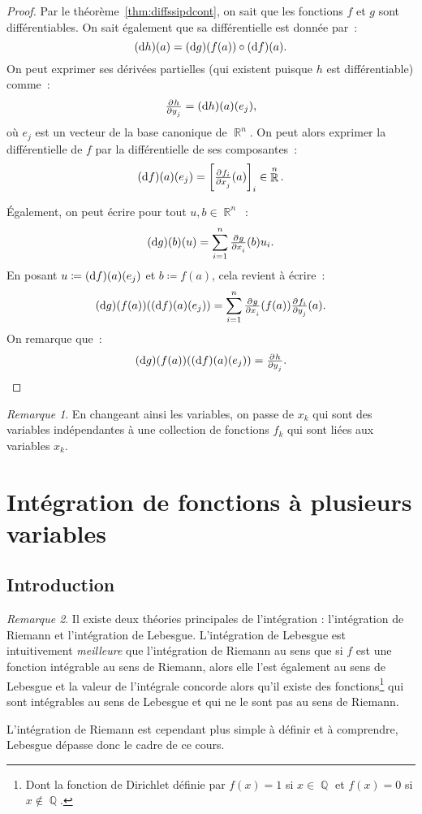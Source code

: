 \documentclass{article}
\DeclareMathOperator{\Q}{\mathbb Q}
\DeclareMathOperator{\R}{\mathbb R}
\theoremstyle{definition}
\theoremstyle{remark}
\newtheorem*{rmq}{Remarque}
\begin{document}
		\begin{proof} Par le théorème~\ref{thm:diffssipdcont}, on sait que les fonctions $f$ et $g$ sont différentiables. On sait également que sa
		différentielle est donnée par~:
		\[(\dif h)(a) = (\dif g)(f(a)) \circ (\dif f)(a).\]
		On peut exprimer ses dérivées partielles (qui existent puisque $h$ est différentiable) comme~:
		\[\pd h{y_j} = (\dif h)(a)(e_j),\]
		où $e_j$ est un vecteur de la base canonique de $\R^n$.
		On peut alors exprimer la différentielle de $f$ par la différentielle de ses composantes~:
		\[(\dif f)(a)(e_j) = \left[\pd {f_i}{x_j}(a)\right]_i \in \R^n.\]

		Également, on peut écrire pour tout $u, b \in \R^n$~:
		\[(\dif g)(b)(u) = \sum_{i=1}^n\pd g{x_i}(b)u_i.\]
		En posant $u \coloneqq (\dif f)(a)(e_j)$ et $b \coloneqq f(a)$, cela revient à écrire~:
		\[(\dif g)(f(a))((\dif f)(a)(e_j)) = \sum_{i=1}^n\pd g{x_i}(f(a))\pd {f_i}{y_j}(a).\]
		On remarque que~:
		\[(\dif g)(f(a))((\dif f)(a)(e_j)) = \pd h{y_j}.\]
		\end{proof}

		\begin{rmq} En changeant ainsi les variables, on passe de $x_k$ qui sont des variables indépendantes à une collection de fonctions $f_k$ qui sont liées
		aux variables $x_k$.
		\end{rmq}

\newpage
\section{Intégration de fonctions à plusieurs variables}
	\subsection{Introduction}
		\begin{rmq} Il existe deux théories principales de l'intégration : l'intégration de Riemann et l'intégration de Lebesgue. L'intégration de Lebesgue est
		intuitivement \emph{meilleure} que l'intégration de Riemann au sens que si $f$ est une fonction intégrable au sens de Riemann, alors elle l'est également
		au sens de Lebesgue et la valeur de l'intégrale concorde alors qu'il existe des fonctions\footnote{Dont la fonction de Dirichlet définie par
		$f(x) = 1$ si $x \in \Q$ et $f(x) = 0$ si $x \not \in \Q$.} qui sont intégrables au sens de Lebesgue et qui ne le sont pas au sens de Riemann.

		L'intégration de Riemann est cependant plus simple à définir et à comprendre, Lebesgue dépasse donc le cadre de ce cours.
		\end{rmq}
\end{document}
